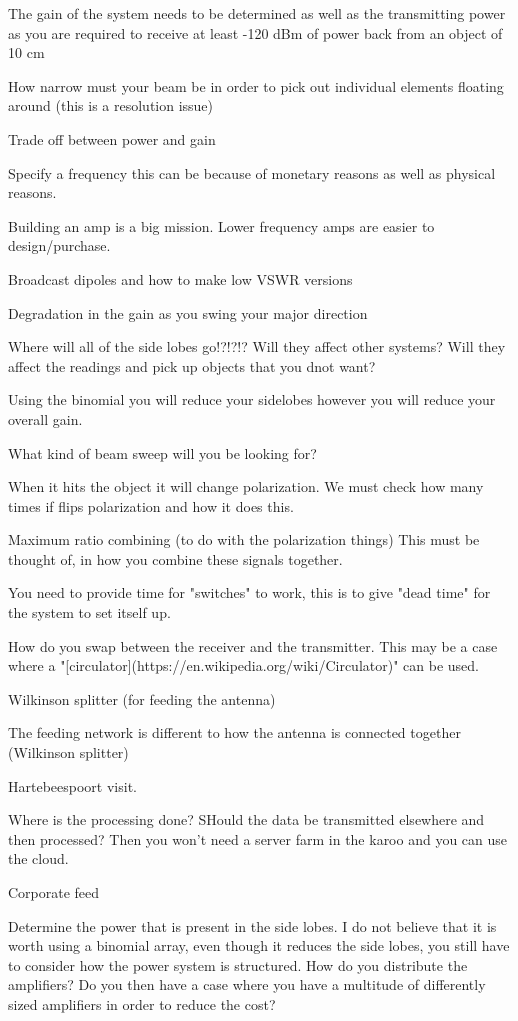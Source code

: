 \documentclass[11pt]{witseiepaper}
\begin{document}
The gain of the system needs to be determined as well as the transmitting power as you are required to receive at least -120 dBm of power back from an object of 10 cm

How narrow must your beam be in order to pick out individual elements floating around (this is a resolution issue)

Trade off between power and gain

Specify a frequency this can be because of monetary reasons as well as physical reasons.

Building an amp is a big mission. Lower frequency amps are easier to design/purchase.

Broadcast dipoles and how to make low VSWR versions

Degradation in the gain as you swing your major direction

Where will all of the side lobes go!?!?!? Will they affect other systems? Will they affect the readings and pick up objects that you dnot want?

Using the binomial you will reduce your sidelobes however you will reduce your overall gain.

What kind of beam sweep will you be looking for?

When it hits the object it will change polarization. We must check how many times if flips polarization and how it does this.

Maximum ratio combining (to do with the polarization things) This must be thought of, in how you combine these signals together. 

You need to provide time for "switches" to work, this is to give "dead time" for the system to set itself up.

How do you swap between the receiver and the transmitter.
This may be a case where a "[circulator](https://en.wikipedia.org/wiki/Circulator)" can be used.

Wilkinson splitter (for feeding the antenna)

The feeding network is different to how the antenna is connected together (Wilkinson splitter)

Hartebeespoort visit.

Where is the processing done? SHould the data be transmitted elsewhere and then processed? Then you won't need a server farm in the karoo and you can use the cloud.


Corporate feed

Determine the power that is present in the side lobes. 
I do not believe that it is worth using a binomial array, even though it reduces the side lobes, you still have to consider how the power system is structured. How do you distribute the amplifiers? Do you then have a case where you have a multitude of differently sized amplifiers in order to reduce the cost? 
\end{document}
